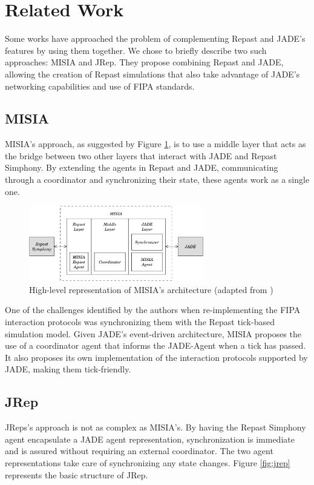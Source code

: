 \section{Related Work} %
\label{sec:related_work}

Some works \cite{garcia2011misia,gormer2011jrep,YooG08,warden2010towards} have approached the problem of complementing Repast and JADE's features by using them together.
We chose to briefly describe two such approaches: MISIA and JRep. They propose combining Repast and \gls{JADE}, allowing the creation of Repast simulations that also take advantage of JADE's networking capabilities and use of \gls{FIPA} standards.

\subsection{MISIA}
MISIA's approach, as suggested by Figure \ref{fig:misia}, is to use a middle layer that acts as the bridge between two other layers that interact with JADE and Repast Simphony.
By extending the agents in Repast and JADE, communicating through a coordinator and synchronizing their state, these agents work as a single one.

\begin{figure}
	\centering
	\includegraphics[width=3.0in]{figures/MISIA.pdf}
	\caption{High-level representation of MISIA's architecture (adapted from \cite{garcia2011misia})}
	\label{fig:misia}
\end{figure}

One of the challenges identified by the authors when re-implementing the FIPA interaction protocols was synchronizing them with the Repast tick-based simulation model.
Given JADE's event-driven architecture, MISIA proposes the use of a coordinator agent that informs the JADE-Agent when a tick has passed.
It also proposes its own implementation of the interaction protocols supported by JADE, making them tick-friendly.

\subsection{JRep}
JReps's approach is not as complex as MISIA's.
By having the Repast Simphony agent encapsulate a JADE agent representation, synchronization is immediate and is assured without requiring an external coordinator.
The two agent representations take care of synchronizing any state changes.
Figure \ref{fig:jrep} represents the basic structure of JRep.

